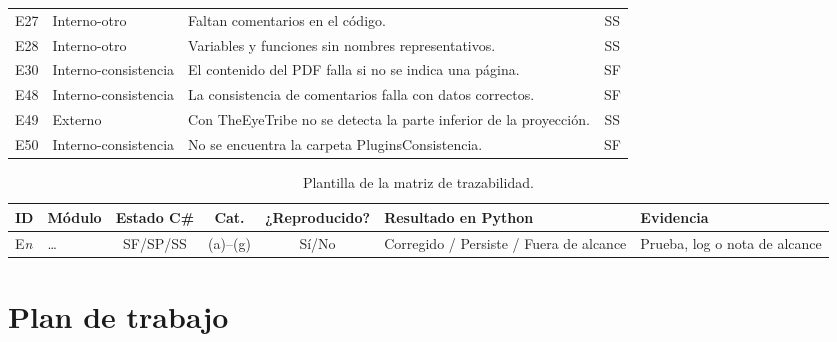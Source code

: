 \begin{table}[H]
\begin{tabularx}{\textwidth}{l l X c}
E27 & Interno-otro & Faltan comentarios en el código. & SS \\
E28 & Interno-otro & Variables y funciones sin nombres representativos. & SS \\
E30 & Interno-consistencia & El contenido del PDF falla si no se indica una página. & SF \\
E48 & Interno-consistencia & La consistencia de comentarios falla con datos correctos. & SF \\
E49 & Externo & Con TheEyeTribe no se detecta la parte inferior de la proyección. & SS \\
E50 & Interno-consistencia & No se encuentra la carpeta PluginsConsistencia. & SF \\ \bottomrule
\end{tabularx}
\end{table}

\begin{table}[H]
\centering
\caption{Plantilla de la matriz de trazabilidad.}
\label{tab:plantilla_traz}
\footnotesize
\begin{tabularx}{\textwidth}{l l c c c >{\raggedright\arraybackslash}X >{\raggedright\arraybackslash}X}
\toprule
ID & Módulo & Estado C\# & Cat. & ¿Reproducido? & Resultado en Python & Evidencia \\ \midrule
E\textit{n} & \dots & SF/SP/SS & (a)--(g) & Sí/No & Corregido / Persiste / Fuera de alcance & Prueba, log o nota de alcance \\ \bottomrule
\end{tabularx}
\end{table}

\chapter{Plan de trabajo}
\label{an:plan}

